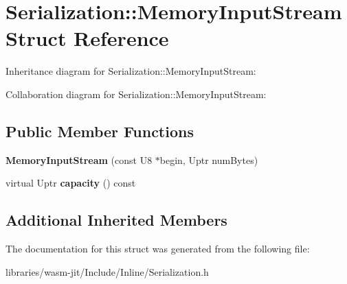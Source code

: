 \hypertarget{struct_serialization_1_1_memory_input_stream}{}\section{Serialization\+:\+:Memory\+Input\+Stream Struct Reference}
\label{struct_serialization_1_1_memory_input_stream}


Inheritance diagram for Serialization\+:\+:Memory\+Input\+Stream\+:


Collaboration diagram for Serialization\+:\+:Memory\+Input\+Stream\+:
\subsection*{Public Member Functions}
\begin{DoxyCompactItemize}
\item 
\mbox{\label{struct_serialization_1_1_memory_input_stream_a09ddbe4a226083e5cadc9426958c24b2}} 
{\bfseries Memory\+Input\+Stream} (const U8 $\ast$begin, Uptr num\+Bytes)
\item 
\mbox{\label{struct_serialization_1_1_memory_input_stream_a23beec28239d63e3ed3623c7a224dc7c}} 
virtual Uptr {\bfseries capacity} () const
\end{DoxyCompactItemize}
\subsection*{Additional Inherited Members}


The documentation for this struct was generated from the following file\+:\begin{DoxyCompactItemize}
\item 
libraries/wasm-\/jit/\+Include/\+Inline/Serialization.\+h\end{DoxyCompactItemize}
